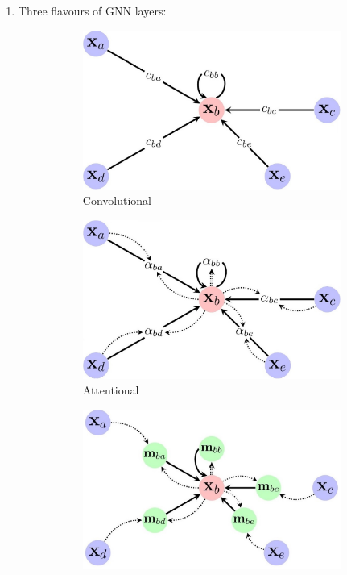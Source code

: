\documentclass{article}
\begin{document}
\begin{enumerate}
	\item Three flavours of GNN layers:
	\begin{figure}[h]
		\centering
		\begin{subfigure}[b]{0.3\textwidth}
			\centering
			\includegraphics[width=\textwidth]{figs/convolutional-gnn}
			\caption{Convolutional}
			\label{fig:convolutional-gnn}
		\end{subfigure}
		\begin{subfigure}[b]{0.3\textwidth}
			\centering
			\includegraphics[width=\textwidth]{figs/attentional-gnn}
			\caption{Attentional}
			\label{fig:attentional-gnn}
		\end{subfigure}
		\begin{subfigure}[b]{0.3\textwidth}
			\centering
			\includegraphics[width=\textwidth]{figs/message-passing-gnn}

\end{subfigure}
\end{figure}
\end{enumerate}
\end{document}
